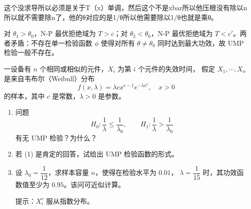 \begin{dxtips}
    这个没求导所以必须是关于T（x）单调，然后这个不是xbar所以他压根没有除以n所以就不需要除n了，他的θ对应的是1/θ所以他需要除以1/θ也就是乘θ。
\end{dxtips}
\begin{dxtips}
    对 $\theta_1 > \theta_0$，N-P 最优拒绝域为 $T > c$；对 $\theta_2 < \theta_0$，N-P 最优拒绝域为 $T < c'$。两者矛盾：不存在单一检验函数 $\phi$ 使得对所有 $\theta \neq \theta_0$ 同时达到最大功效，故 UMP 检验一般不存在。
\end{dxtips}
\begin{homework}[6]
一设备有 $n$ 个相同或相似的元件，$X_i$ 为第 $i$ 个元件的失效时间，
假定 $X_1,\cdots,X_n$ 是来自韦布尔（Weibull）分布
\[
    f(x,\lambda)=\lambda c x^{c-1}e^{-\lambda x^c},\quad x>0
\]
的样本，其中 $c$ 是常数，$\lambda>0$ 是参数。

\begin{enumerate}
    \item 问题
    \[
        H_0:\frac{1}{\lambda}\leq \frac{1}{\lambda_0},
        \qquad
        H_1:\frac{1}{\lambda}>\frac{1}{\lambda_0}
    \]
    有无 UMP 检验？为什么？

    \item 若 (1) 是肯定的回答，试给出 UMP 检验函数的形式。

    \item 设 $\lambda_0=\dfrac{1}{12}$，求样本容量 $n$，使得在检验水平为 $0.01$，
    $\lambda=\dfrac{1}{15}$ 时，其功效函数值至少为 $0.95$。该问可近似计算。

    提示：$X_i^c$ 服从指数分布。
\end{enumerate}
\end{homework}
